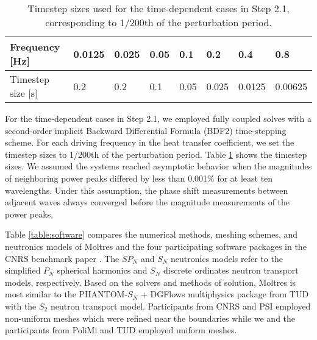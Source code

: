 \begin{table}[tb]
    \caption{Timestep sizes used for the time-dependent cases in
    Step 2.1, corresponding to 1/200th of the perturbation period.}
	\centering
	\setlength\tabcolsep{2.5pt}
	\begin{tabular}{l l l l l l l l}
	    \toprule
	    Frequency [Hz] & 0.0125 & 0.025 & 0.05 & 0.1 & 0.2 & 0.4 & 0.8 \\
	    \midrule
	    Timestep size [s] & 0.2 & 0.2 & 0.1 & 0.05 & 0.025 & 0.0125 & 0.00625
	    \\
	    \bottomrule
	\end{tabular}
	\label{table:timestep}
\end{table}

For the time-dependent cases in Step 2.1, we employed fully coupled solves with
a second-order implicit Backward Differential Formula (BDF2) time-stepping
scheme. For each driving frequency in the heat transfer coefficient, we set the
timestep sizes to 1/200th of the perturbation period. Table
\ref{table:timestep} shows the timestep sizes. We assumed the
systems reached asymptotic behavior when the magnitudes of neighboring power
peaks differed by less than 0.001\% for at least ten wavelengths. Under this
assumption, the phase shift measurements between adjacent waves always
converged before the magnitude measurements of the power peaks.

Table \ref{table:software} compares the numerical methods, meshing schemes, and
neutronics models of Moltres and the four participating software packages in
the CNRS benchmark paper \cite{tiberga_results_2020}. The $SP_N$ and
$S_N$ neutronics models refer to the simplified $P_N$ spherical harmonics and
$S_N$ discrete ordinates neutron transport models, respectively. Based on the
solvers and methods of solution, Moltres is most similar to the
PHANTOM-$S_N$ + DGFlows \cite{tiberga_discontinuous_2019} multiphysics package
from \gls{TUD} with the $S_2$ neutron transport model. Participants from
\gls{CNRS} and \gls{PSI}
employed non-uniform meshes which were refined near the boundaries while we and
the participants from \gls{PoliMi} and \gls{TUD} employed uniform meshes.

\FloatBarrier

